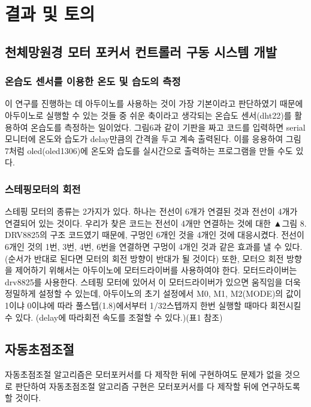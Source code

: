 \section{결과 및 토의}

\subsection{천체망원경 모터 포커서 컨트롤러 구동 시스템 개발}

\subsubsection{온습도 센서를 이용한 온도 및 습도의 측정}

이 연구를 진행하는 데 아두이노를 사용하는 것이 가장 기본이라고 판단하였기 때문에 아두이노로 실행할 수 있는 것들 중 쉬운 축이라고 생각되는 온습도 센서(dht22)를 활용하여 온습도를 측정하는 일이었다. 그림6과 같이 기판을 짜고 코드를 입력하면 serial 모니터에 온도와 습도가 delay만큼의 간격을 두고 계속 출력된다.
이를 응용하여 그림 7처럼 oled(oled1306)에 온도와 습도를 실시간으로 출력하는 프로그램을 만들 수도 있다.

\subsubsection{스테핑모터의 회전}

스테핑 모터의 종류는 2가지가 있다. 하나는 전선이 6개가 연결된 것과 전선이 4개가 연결되어 있는 것이다. 우리가 찾은 코드는 전선이 4개만 연결하는 것에 대한
▲그림 8. DRV8825의 구조
코드였기 때문에, 구멍인 6개인 것을 4개인 것에 대응시켰다. 전선이 6개인 것의 1번, 3번, 4번, 6번을 연결하면 구멍이 4개인 것과 같은 효과를 낼 수 있다. (순서가 반대로 된다면 모터의 회전 방향이 반대가 될 것이다) 또한, 모터으 회전 방향을 제어하기 위해서는 아두이노에 모터드라이버를 사용하여야 한다. 모터드라이버는 drv8825를 사용한다. 스테핑 모터에 있어서 이 모터드라이버가 있으면 움직임을 더욱 정밀하게 설정할 수 있는데, 아두이노의 초기 설정에서 M0, M1, M2(MODE)의 값이 1이냐 0이냐에 따라 풀스텝(1.8)에서부터 1/32스텝까지 한번 실행할 때마다 회전시킬 수 있다. (delay에 따라회전 속도를 조절할 수 있다.)(표1 참조)

\subsection{자동초점조절}

자동초점조절 알고리즘은 모터포커서를 다 제작한 뒤에 구현하여도 문제가 없을 것으로 판단하여 자동초점조절 알고리즘 구현은 모터포커서를 다 제작할 뒤에 연구하도록 할 것이다.
